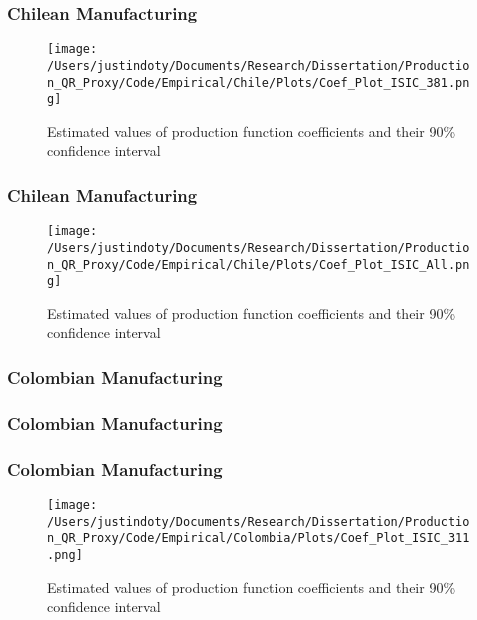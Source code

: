 \documentclass{beamer}
\begin{document}
\begin{frame}
\frametitle{Chilean Manufacturing}
\begin{figure}[ht]
\centering
\texttt{[image: /Users/justindoty/Documents/Research/Dissertation/Production\_QR\_Proxy/Code/Empirical/Chile/Plots/Coef\_Plot\_ISIC\_381.png]}
\caption{Estimated values of production function coefficients and their 90\% confidence interval}
\end{figure}
\end{frame}

\begin{frame}
\frametitle{Chilean Manufacturing}
\begin{figure}[ht]
\centering
\texttt{[image: /Users/justindoty/Documents/Research/Dissertation/Production\_QR\_Proxy/Code/Empirical/Chile/Plots/Coef\_Plot\_ISIC\_All.png]}
\caption{Estimated values of production function coefficients and their 90\% confidence interval}
\end{figure}
\end{frame}


\begin{frame}
\frametitle{Colombian Manufacturing}
\scriptsize

\end{frame}

\begin{frame}
\frametitle{Colombian Manufacturing}
\scriptsize

\end{frame}

\begin{frame}
\frametitle{Colombian Manufacturing}
\begin{figure}[ht]
\centering
\texttt{[image: /Users/justindoty/Documents/Research/Dissertation/Production\_QR\_Proxy/Code/Empirical/Colombia/Plots/Coef\_Plot\_ISIC\_311.png]}
\caption{Estimated values of production function coefficients and their 90\% confidence interval}
\end{figure}
\end{frame}
\end{document}
